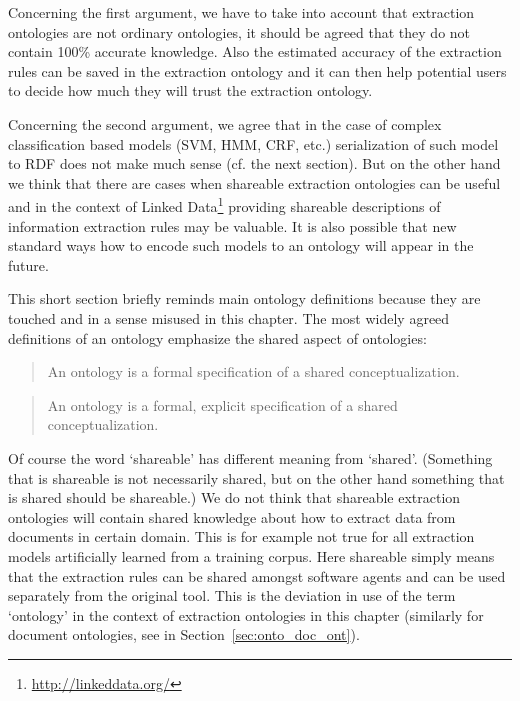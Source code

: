 Concerning the first argument, we have to take into account that extraction ontologies are not ordinary ontologies, it should be agreed that they do not contain 100\% accurate knowledge. Also the estimated accuracy of the extraction rules can be saved in the extraction ontology and it can then help potential users to decide how much they will trust the extraction ontology.

Concerning the second argument, we agree that in the case of complex classification based models (SVM, HMM, CRF, etc.) serialization of such model to RDF does not make much sense (cf. the next section). But on the other hand we think that there are cases when shareable extraction ontologies can be useful and in the context of Linked Data\footnote{\url{http://linkeddata.org/}} providing shareable descriptions of information extraction rules may be valuable. It is also possible that new standard ways how to encode such models to an ontology will appear in the future.


This short section briefly reminds main ontology definitions because they are touched and in a sense misused in this chapter. The most widely agreed definitions of an ontology emphasize the shared aspect of ontologies: 
\begin{quote}
An ontology is a formal specification of a shared conceptualization.	\citep{so17864}
\end{quote}

\begin{quote}
An ontology is a formal, explicit specification of a shared conceptualization. \citep{Studer1998161}
\end{quote}

Of course the word `shareable' has different meaning from `shared'. (Something that is shareable is not necessarily shared, but on the other hand something that is shared should be shareable.) We do not think that shareable extraction ontologies will contain shared knowledge about how to extract data from documents in certain domain. This is for example not true for all extraction models artificially learned from a training corpus. Here shareable simply means that the extraction rules can be shared amongst software agents and can be used separately from the original tool. This is the deviation in use of the term `ontology' in the context of extraction ontologies in this chapter (similarly for document ontologies, see in Section~\ref{sec:onto_doc_ont}).






